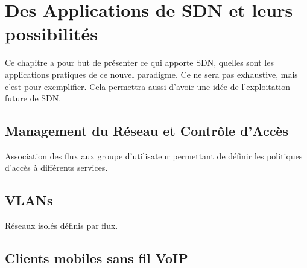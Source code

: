 
\chapter{Des Applications de SDN et leurs possibilités}

Ce chapitre a pour but de présenter ce qui apporte SDN, quelles sont les applications pratiques de ce nouvel paradigme. Ce ne sera pas exhaustive, mais c'est pour exemplifier. Cela permettra aussi d'avoir une idée de l'exploitation future de SDN.

\section{Management du Réseau et Contrôle d'Accès}
Association des flux aux groupe d'utilisateur permettant de définir les politiques d'accès à différents services.

\section{VLANs}
Réseaux isolés définis par flux.

\section{Clients mobiles sans fil VoIP}


